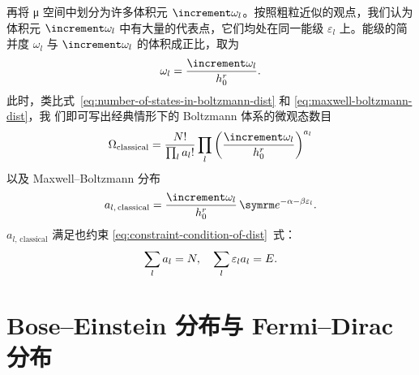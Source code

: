 再将 μ 空间中划分为许多体积元 $\incr{\omega_l}$。按照粗粒近似的观点，我们认为体积元
$\incr{\omega_l}$ 中有大量的代表点，它们均处在同一能级 $\varepsilon_l$ 上。能级的简并度 $\omega_l$
与 $\incr{\omega_l}$ 的体积成正比，取为
\begin{equation}
  \omega_l = \frac{\incr{\omega_l}}{h_0^r}.
\end{equation}
此时，类比式~\eqref{eq:number-of-states-in-boltzmann-dist} 和 \eqref{eq:maxwell-boltzmann-dist}，我
们即可写出经典情形下的 Boltzmann 体系的微观态数目
\begin{equation}
  \Omega_\text{classical}
  = \frac{N!}{\prod_l a_l!} \prod_l \qty(\frac{\incr{\omega_l}}{h_0^r})^{a_l}
\end{equation}
以及 Maxwell--Boltzmann 分布
\begin{equation}
  a_{l,\,\text{classical}} = \frac{\incr{\omega_l}}{h_0^r} \, \ee^{-\alpha-\beta\varepsilon_l}.
\end{equation}
$a_{l,\,\text{classical}}$ 满足也约束 \eqref{eq:constraint-condition-of-dist}~式：
\begin{equation}
  \sum_l a_l = N \qc \sum_l \varepsilon_l a_l = E.
\end{equation}

\section{Bose--Einstein 分布与 Fermi--Dirac 分布}
